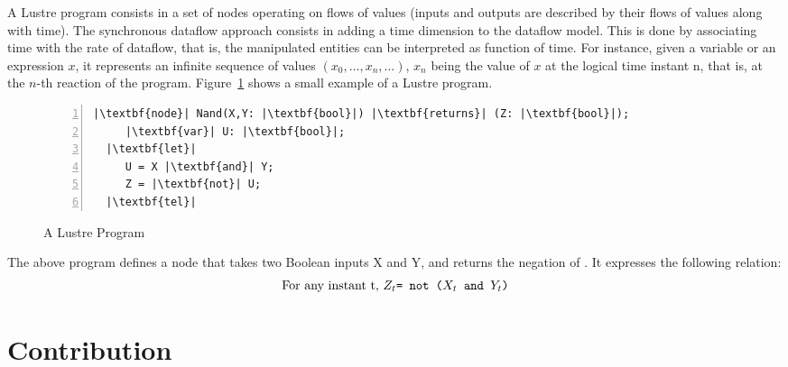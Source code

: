 A Lustre program consists in a set of nodes operating on flows of values (inputs and outputs 
are described by their flows of values along with time). 
The synchronous dataflow approach consists in adding a time dimension to the dataflow model.
This is done by associating time with the rate of dataflow, that is, the manipulated entities
can be interpreted as function of time.
For instance, given a variable or an expression $x$,
it represents an infinite sequence of values $(x_0,\ldots,x_n,\ldots)$, $x_n$ being the value
of $x$ at the logical time instant n, that is, at the $n$-th  reaction of the program. 
Figure~\ref{fig:lustre3} shows a small example of a Lustre program.
\begin{figure}[H]
\begin{lstlisting}[basicstyle=\ttfamily,
escapeinside={||},
mathescape=true,
numbers=left,
backgroundcolor=\color{gray!20}]
  |\textbf{node}| Nand(X,Y: |\textbf{bool}|) |\textbf{returns}| (Z: |\textbf{bool}|);
     |\textbf{var}| U: |\textbf{bool}|;
  |\textbf{let}|
     U = X |\textbf{and}| Y;
     Z = |\textbf{not}| U;
  |\textbf{tel}|
\end{lstlisting}
\caption{A Lustre Program}
\label{fig:lustre3}
\end{figure}
The above program defines a node that takes two Boolean inputs X and Y, and returns the negation
of . It expresses the following relation:
\begin{displaymath}
  \text{For any instant t, \texttt{$Z_t$= not ($X_t$ and $Y_t$)}} 
\end{displaymath}

\section{Contribution}

